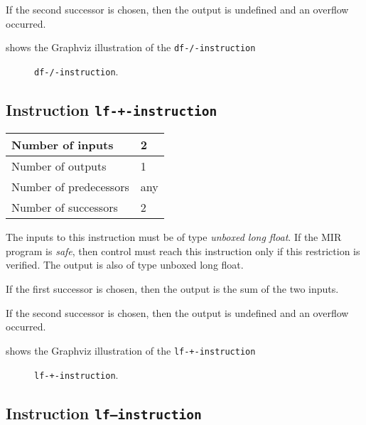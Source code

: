 If the second successor is chosen, then the output is undefined and an
overflow occurred. 

 shows the Graphviz illustration of the
\texttt{df-/-instruction}

\begin{figure}
\begin{center}
\end{center}
\caption{\label{fig-df-/-instruction}
\texttt{df-/-instruction}.}
\end{figure}

\subsection{Instruction \texttt{lf-+-instruction}}
\label{mir-instruction-lf-+}

\begin{tabular}{|l|l|}
\hline
Number of inputs & 2\\
\hline
Number of outputs & 1\\
\hline
Number of predecessors & any\\
\hline
Number of successors & 2\\
\hline
\end{tabular}

The inputs to this instruction must be of type \emph{unboxed long
  float}.  If the MIR program is \emph{safe}, then control must reach
this instruction only if this restriction is verified.  The output is
also of type unboxed long float.

If the first successor is chosen, then the output is
the sum of the two inputs.  

If the second successor is chosen, then the output is undefined and an
overflow occurred. 

 shows the Graphviz illustration of the
\texttt{lf-+-instruction}

\begin{figure}
\begin{center}
\end{center}
\caption{\label{fig-lf-+-instruction}
\texttt{lf-+-instruction}.}
\end{figure}

\subsection{Instruction \texttt{lf---instruction}}
\label{mir-instruction-lf--}

